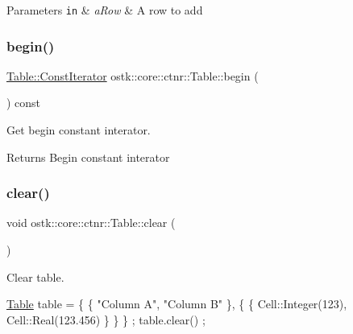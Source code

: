 \begin{DoxyParams}[1]{Parameters}
\mbox{\tt in}  & {\em a\+Row} & A row to add \\
\hline
\end{DoxyParams}
\mbox{\label{classostk_1_1core_1_1ctnr_1_1_table_a0d4c71fa820c4381bd893bde8a0c8e45}} 
\subsubsection{\texorpdfstring{begin()}{begin()}}
{\footnotesize\ttfamily \hyperlink{classostk_1_1core_1_1ctnr_1_1_table_a44e6a375120737f0675ea6689022050f}{Table\+::\+Const\+Iterator} ostk\+::core\+::ctnr\+::\+Table\+::begin (\begin{DoxyParamCaption}{ }\end{DoxyParamCaption}) const}



Get begin constant interator. 

\begin{DoxyReturn}{Returns}
Begin constant interator 
\end{DoxyReturn}
\mbox{\label{classostk_1_1core_1_1ctnr_1_1_table_ad373553dd3803cde127ccdafe540456c}} 
\subsubsection{\texorpdfstring{clear()}{clear()}}
{\footnotesize\ttfamily void ostk\+::core\+::ctnr\+::\+Table\+::clear (\begin{DoxyParamCaption}{ }\end{DoxyParamCaption})}



Clear table. 


\begin{DoxyCode}
\hyperlink{classostk_1_1core_1_1ctnr_1_1_table_a1b799fa804faf23f9dd4905df90a5cd7}{Table} table = \{ \{ \textcolor{stringliteral}{"Column A"}, \textcolor{stringliteral}{"Column B"} \}, \{ \{ Cell::Integer(123), Cell::Real(123.456) \} \} \} ;
table.clear() ;
\end{DoxyCode}
 \mbox{\label{classostk_1_1core_1_1ctnr_1_1_table_af7ec9c84859ac8809021556c1c26dd8b}} 
